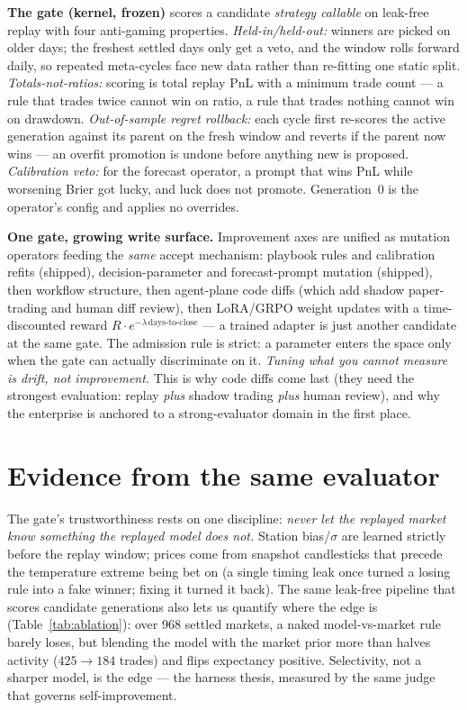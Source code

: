 \documentclass{article}
\begin{document}
\textbf{The gate (kernel, frozen)} scores a candidate \emph{strategy callable} on
leak-free replay with four anti-gaming properties. \emph{Held-in/held-out:}
winners are picked on older days; the freshest settled days only get a veto, and
the window rolls forward daily, so repeated meta-cycles face new data rather than
re-fitting one static split. \emph{Totals-not-ratios:} scoring is total replay
PnL with a minimum trade count --- a rule that trades twice cannot win on ratio, a
rule that trades nothing cannot win on drawdown. \emph{Out-of-sample regret
rollback:} each cycle first re-scores the active generation against its parent on
the fresh window and reverts if the parent now wins --- an overfit promotion is
undone before anything new is proposed. \emph{Calibration veto:} for the forecast
operator, a prompt that wins PnL while worsening Brier got lucky, and luck does
not promote. Generation~0 is the operator's config and applies no overrides.

\textbf{One gate, growing write surface.} Improvement axes are unified as mutation
operators feeding the \emph{same} accept mechanism: playbook rules and
calibration refits (shipped), decision-parameter and forecast-prompt mutation
(shipped), then workflow structure, then agent-plane code diffs (which add shadow
paper-trading and human diff review), then LoRA/GRPO weight updates with a
time-discounted reward $R\cdot e^{-\lambda\,\text{days-to-close}}$ --- a trained
adapter is just another candidate at the same gate. The admission rule is strict:
a parameter enters the space only when the gate can actually discriminate on it.
\emph{Tuning what you cannot measure is drift, not improvement.} This is why code
diffs come last (they need the strongest evaluation: replay \emph{plus} shadow
trading \emph{plus} human review), and why the enterprise is anchored to a
strong-evaluator domain in the first place.

\section{Evidence from the same evaluator}
\label{sec:results}

The gate's trustworthiness rests on one discipline: \emph{never let the replayed
market know something the replayed model does not.} Station bias/$\sigma$ are
learned strictly before the replay window; prices come from snapshot candlesticks
that precede the temperature extreme being bet on (a single timing leak once
turned a losing rule into a fake winner; fixing it turned it back). The same
leak-free pipeline that scores candidate generations also lets us quantify where
the edge is (Table~\ref{tab:ablation}): over 968 settled markets, a naked
model-vs-market rule barely loses, but blending the model with the market prior
more than halves activity ($425\!\to\!184$ trades) and flips expectancy positive.
Selectivity, not a sharper model, is the edge --- the harness thesis, measured by
the same judge that governs self-improvement.
\end{document}
